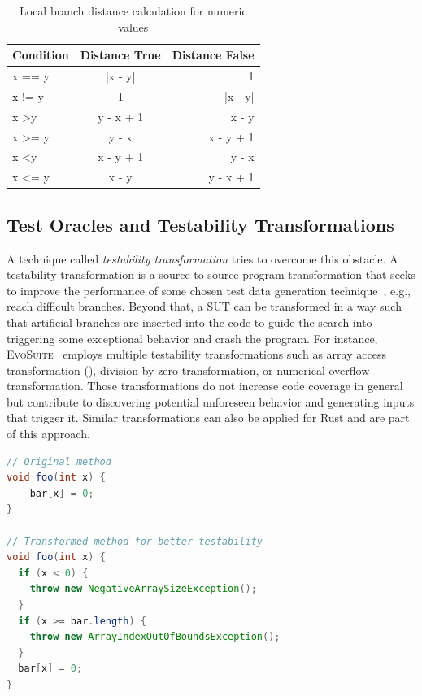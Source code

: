 \documentclass[paper=a4,%
  twoside,%
  BCOR4mm,%
  abstract=true,%
  toc=bibliography,%
  chapterprefix=true,%
  toc=bibliographynumbered,%
  open=right,%
  english,%
  pagesize=pdftex]{scrreprt}
\begin{document}
\begin{table}[]
\centering
\begin{tabular}{lcr}
\hline
\textbf{Condition}  & \textbf{Distance True} & \textbf{Distance False} \\
\hline
x == y              & |x - y|                & 1                       \\
x != y              & 1                      & |x - y|                 \\
x \textgreater y    & y - x + 1              & x - y                   \\
x \textgreater{}= y & y - x                  & x - y + 1               \\
x \textless y       & x - y + 1              & y - x                   \\
x \textless{}= y    & x - y                  & y - x + 1               \\ \hline
\end{tabular}
\caption{Local branch distance calculation for numeric values}
\label{tab:local-branch-distance-formulas}
\end{table}

\subsection{Test Oracles and Testability Transformations}
\label{sec:testability-transformations}


A technique called \textit{testability transformation} tries to overcome this obstacle. A testability transformation is a source-to-source program transformation that seeks to improve the performance of some chosen test data generation technique~\cite{Harman2004}, e.g., reach difficult branches. Beyond that, a \ac{SUT} can be transformed in a way such that artificial branches are inserted into the code to guide the search into triggering some exceptional behavior and crash the program. For instance, \textsc{EvoSuite}~\cite{Fraser2013} employs multiple testability transformations such as array access transformation (), division by zero transformation, or numerical overflow transformation. Those transformations do not increase code coverage in general but contribute to discovering potential unforeseen behavior and generating inputs that trigger it. Similar transformations can also be applied for Rust and are part of this approach.

\begin{lstlisting}[language=Java, style=boxed, caption={Array access transformation in \textsc{EvoSuite} for Java}, label=lst:evosuite-array-access-transformation]
// Original method
void foo(int x) {
    bar[x] = 0;
}

// Transformed method for better testability
void foo(int x) {
  if (x < 0) {
    throw new NegativeArraySizeException();
  }
  if (x >= bar.length) {
    throw new ArrayIndexOutOfBoundsException();
  }
  bar[x] = 0;
}
\end{lstlisting}
\end{document}
